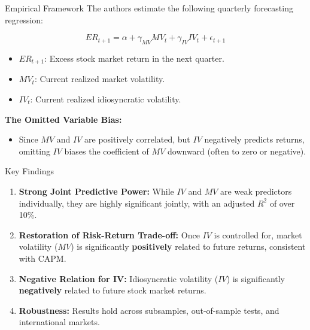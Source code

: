 \documentclass{beamer}
\begin{document}
\begin{frame}{Empirical Framework}
     The authors estimate the following quarterly forecasting regression:
    
    \begin{equation}
        ER_{t+1} = \alpha + \gamma_{MV} MV_t + \gamma_{IV} IV_t + \epsilon_{t+1}
    \end{equation}

    \begin{itemize}
        \item $ER_{t+1}$: Excess stock market return in the next quarter.
        \item $MV_t$: Current realized market volatility.
        \item $IV_t$: Current realized idiosyncratic volatility.
    \end{itemize}

    \vspace{0.5cm}
     \textbf{The Omitted Variable Bias:}
    \begin{itemize}
        \item Since $MV$ and $IV$ are positively correlated, but $IV$ negatively predicts returns, omitting $IV$ biases the coefficient of $MV$ downward (often to zero or negative).
    \end{itemize}
\end{frame}

\begin{frame}{Key Findings}
    \begin{enumerate}
        \item \textbf{Strong Joint Predictive Power:} 
             While $IV$ and $MV$ are weak predictors individually, they are highly significant jointly, with an adjusted $R^2$ of over 10\%.
        
        \item \textbf{Restoration of Risk-Return Trade-off:} 
             Once $IV$ is controlled for, market volatility ($MV$) is significantly \textbf{positively} related to future returns, consistent with CAPM.

        \item \textbf{Negative Relation for IV:} 
             Idiosyncratic volatility ($IV$) is significantly \textbf{negatively} related to future stock market returns.

        \item \textbf{Robustness:} 
             Results hold across subsamples, out-of-sample tests, and international markets.
    \end{enumerate}
\end{frame}
\end{document}
